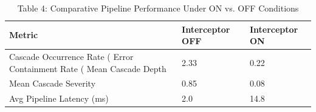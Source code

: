 \begin{table}
\caption{Table 4: Comparative Pipeline Performance Under ON vs. OFF Conditions}
\label{tab:table4_interceptor_on_off}
\begin{tabular}{lll}
\toprule
Metric & Interceptor OFF & Interceptor ON \\
\midrule
Cascade Occurrence Rate (%
Error Containment Rate (%
Mean Cascade Depth & 2.33 & 0.22 \\
Mean Cascade Severity & 0.85 & 0.08 \\
Avg Pipeline Latency (ms) & 2.0 & 14.8 \\
\bottomrule
\end{tabular}
\end{table}
